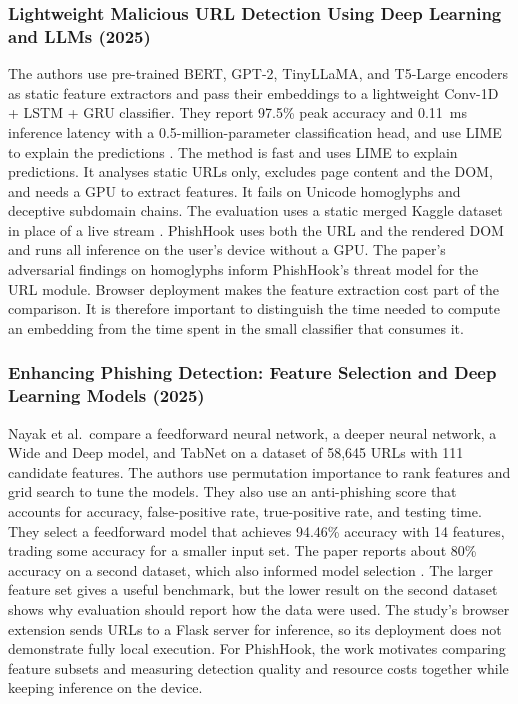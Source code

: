 \documentclass{FastFyp}
\begin{document}
\subsubsection{Lightweight Malicious URL Detection Using Deep Learning and LLMs (2025)}
The authors use pre-trained BERT, GPT-2, TinyLLaMA, and T5-Large encoders as static feature extractors and pass their embeddings to a lightweight Conv-1D + LSTM + GRU classifier. They report 97.5\% peak accuracy and 0.11~ms inference latency with a 0.5-million-parameter classification head, and use LIME to explain the predictions \cite{llmurl2025}. The method is fast and uses LIME to explain predictions. It analyses static URLs only, excludes page content and the DOM, and needs a GPU to extract features. It fails on Unicode homoglyphs and deceptive subdomain chains. The evaluation uses a static merged Kaggle dataset in place of a live stream \cite{llmurl2025}. PhishHook uses both the URL and the rendered DOM and runs all inference on the user's device without a GPU. The paper's adversarial findings on homoglyphs inform PhishHook's threat model for the URL module. Browser deployment makes the feature extraction cost part of the comparison. It is therefore important to distinguish the time needed to compute an embedding from the time spent in the small classifier that consumes it.

\subsubsection{Enhancing Phishing Detection: Feature Selection and Deep Learning Models (2025)}
Nayak et al.\ compare a feedforward neural network, a deeper neural network, a Wide and Deep model, and TabNet on a dataset of 58,645 URLs with 111 candidate features. The authors use permutation importance to rank features and grid search to tune the models. They also use an anti-phishing score that accounts for accuracy, false-positive rate, true-positive rate, and testing time. They select a feedforward model that achieves 94.46\% accuracy with 14 features, trading some accuracy for a smaller input set. The paper reports about 80\% accuracy on a second dataset, which also informed model selection \cite{nayak2025featurephishing}. The larger feature set gives a useful benchmark, but the lower result on the second dataset shows why evaluation should report how the data were used. The study's browser extension sends URLs to a Flask server for inference, so its deployment does not demonstrate fully local execution. For PhishHook, the work motivates comparing feature subsets and measuring detection quality and resource costs together while keeping inference on the device.
\end{document}
